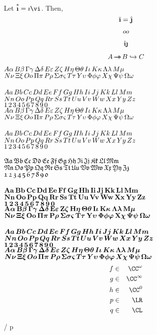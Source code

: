 \documentclass[11pt]{article}
\begin{document}
\begin{thm}
    Let $\overset{*}{\vii}=\ii\vi$. Then,
    \[\ov{\vii} = \hat{\vjj}\]    
\end{thm}

\[ \StrGobbleLeft{foo}{1} \]

\[ \hat{\vii} \vjj \]

\[ A \srj B \inj C \]

\noindent
$\greek$ \\
$\greekk$ \\ \\
$\fld{\alphabet}$ \\
$\fld{\alphabett}$ \\
$\fld{\numbers}$ \\
$\fld{\greek}$ \\
$\fld{\greekk}$ \\ \\
$\cat{\alphabet}$ \\
$\cat{\alphabett}$ \\
$\cat{\numbers}$ \\ \\
$\lie{\alphabet}$ \\
$\lie{\alphabett}$ \\
$\lie{\numbers}$ \\ \\
$\vect{\alphabet}$ \\
$\vect{\alphabett}$ \\
$\vect{\numbers}$ \\ 
$\vect{\greek}$ \\
$\vect{\greekk}$ \\ \\
$\ivect{\alphabet}$ \\
$\ivect{\alphabett}$ \\
$\ivect{\numbers}$ \\
$\ivect{\greek}$ \\
$\ivect{\greekk}$ \\

\begin{eqnarray*}
    f &\in& \cnt^\om \\
    g &\in& \cnt^\infty \\
    h &\in& \cnt^0 \\
    p &\in& \rie \\ 
    q &\in& \lbe
\end{eqnarray*}

\begin{center}
     \into \tp{\ae} / \blank p
\end{center}
\end{document}
